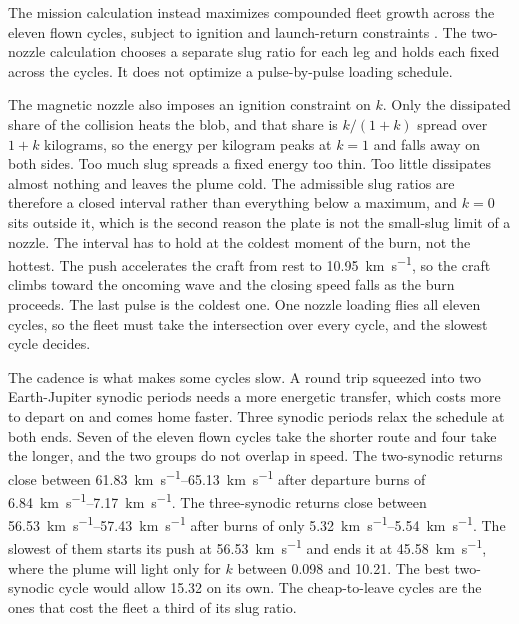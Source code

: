 \documentclass{article}
\begin{document}
The mission calculation instead maximizes compounded fleet growth across the eleven flown cycles, subject to ignition and launch-return constraints \cite{Katz_aim_is_all_you_need_2025}. The two-nozzle calculation chooses a separate slug ratio for each leg and holds each fixed across the cycles. It does not optimize a pulse-by-pulse loading schedule.

The magnetic nozzle also imposes an ignition constraint on $k$. Only the dissipated share of the collision heats the blob, and that share is $k/(1+k)$ spread over $1+k$ kilograms, so the energy per kilogram peaks at $k=1$ and falls away on both sides. Too much slug spreads a fixed energy too thin. Too little dissipates almost nothing and leaves the plume cold. The admissible slug ratios are therefore a closed interval rather than everything below a maximum, and $k=0$ sits outside it, which is the second reason the plate is not the small-slug limit of a nozzle. The interval has to hold at the coldest moment of the burn, not the hottest. The push accelerates the craft from rest to \SI{10.95}{\kilo\meter\per\second}, so the craft climbs toward the oncoming wave and the closing speed falls as the burn proceeds. The last pulse is the coldest one. One nozzle loading flies all eleven cycles, so the fleet must take the intersection over every cycle, and the slowest cycle decides.

The cadence is what makes some cycles slow. A round trip squeezed into two Earth-Jupiter synodic periods needs a more energetic transfer, which costs more to depart on and comes home faster. Three synodic periods relax the schedule at both ends. Seven of the eleven flown cycles take the shorter route and four take the longer, and the two groups do not overlap in speed. The two-synodic returns close between \SIrange[range-phrase={ and }]{61.83}{65.13}{\kilo\meter\per\second} after departure burns of \SIrange{6.84}{7.17}{\kilo\meter\per\second}. The three-synodic returns close between \SIrange[range-phrase={ and }]{56.53}{57.43}{\kilo\meter\per\second} after burns of only \SIrange{5.32}{5.54}{\kilo\meter\per\second}. The slowest of them starts its push at \SI{56.53}{\kilo\meter\per\second} and ends it at \SI{45.58}{\kilo\meter\per\second}, where the plume will light only for $k$ between 0.098 and 10.21. The best two-synodic cycle would allow 15.32 on its own. The cheap-to-leave cycles are the ones that cost the fleet a third of its slug ratio.
\end{document}
